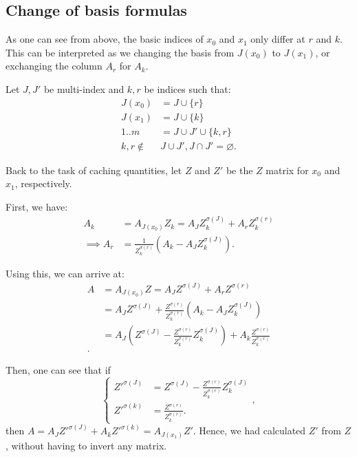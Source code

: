 
\subsection{Change of basis formulas} %
\label{sub:Change of basis formulas}
As one can see from above, the basic indices of \( x_{0} \) and \( x_{1} \) only
differ at \( r \) and \( k \). This can be interpreted as we changing the basis
from \( J(x_{0}) \) to \( J(x_{1}) \), or exchanging the column \( A_{r} \) for
\( A_{k} \).

Let \( J, J' \) be multi-index and \( k, r \) be indices such that:
\begin{align*}
  J(x_{0}) &= J \cup \{r\}   \\
  J(x_{1}) &= J \cup \{k\}\\
  1..m &= J \cup J' \cup \{k, r\}   \\
  k, r \notin &J \cup J', J \cap J' = \varnothing
.\end{align*}



Back to the task of caching quantities, let \( Z \) and \(
Z'\) be the \( Z \) matrix for \( x_{0} \) and \( x_{1} \), respectively.

First, we have:
\begin{align*}
  A_{k} &= A_{J(x_{0})}Z_{k} = A_{J}Z^{\sigma(J)}_{k} + A_{r}Z^{\sigma(r)}_{k} \\
  \implies A_{r} &= \frac{1}{Z^{\sigma(r)}_{k}}\left( A_{k} -
  A_{J}Z^{\sigma(J)}_{k} \right)
.\end{align*}

Using this, we can arrive at:
\begin{align*}
  A &= A_{J(x_{0})}Z = A_{J}Z^{\sigma(J)} + A_{r}Z^{\sigma(r)}  \\
  &= A_{J}Z^{\sigma(J)} + \frac{Z^{\sigma(r)}}{Z^{\sigma(r)}_{k}}\left( A_{k} -
  A_{J}Z^{\sigma(J)}_{k} \right)  \\
  &= A_{J}\left(Z^{\sigma(J)} -
  \frac{Z^{\sigma(r)}}{Z^{\sigma(r)}_{k}}Z^{\sigma(J)}_{k} \right) +
  A_{k}\frac{Z^{\sigma(r)}}{Z^{\sigma(r)}_{k}} \\
.\end{align*}

Then, one can see that if
\[
\begin{cases}
  Z'^{\sigma(J)} &= Z^{\sigma(J)} -
  \frac{Z^{\sigma(r)}}{Z^{\sigma(r)}_{k}}Z^{\sigma(J)}_{k} \\
  Z'^{\sigma(k)} &= \frac{Z^{\sigma(r)}}{Z^{\sigma(r)}_{k}}
.\end{cases}
,\] then \( A = A_{J}Z'^{\sigma(J)} + A_{k}Z'^{\sigma(k)} = A_{J(x_{1})}Z'
\). Hence, we had calculated \( Z' \) from \( Z \), without having to invert any
matrix.

